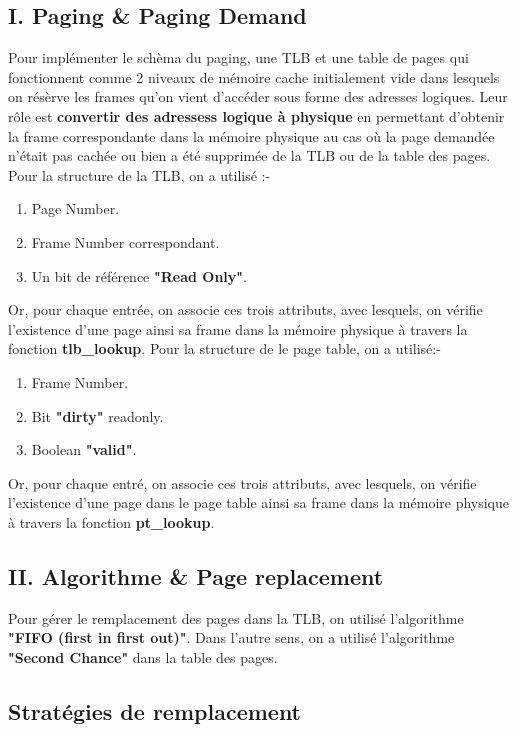 \documentclass{article}
\begin{document}
\subsection*{I. Paging \& Paging Demand}
Pour implémenter le schèma du paging, une TLB et une table de pages qui fonctionnent comme 2 niveaux de mémoire cache initialement vide dans lesquels on résèrve les frames qu'on vient d'accéder sous forme des adresses logiques. Leur rôle est \textbf{convertir des adressess logique à physique} en permettant d'obtenir la frame correspondante dans la mémoire physique au cas où la page demandée n'était pas cachée ou bien a été supprimée de la TLB ou de la table des pages.
Pour la structure de la TLB, on a utilisé :-
\begin{enumerate}
	\item Page Number.
	\item Frame Number correspondant.
	\item Un bit de référence \textbf{"Read Only"}.
\end{enumerate}
Or, pour chaque entrée, on associe ces trois attributs, avec lesquels, on vérifie l'existence d'une page ainsi sa frame dans la mémoire physique à travers la fonction \textbf{tlb\_lookup}.\newline 
Pour la structure de le page table, on a utilisé:-
\begin{enumerate}
	\item Frame Number.
	\item Bit \textbf{"dirty"} readonly.
	\item Boolean \textbf{"valid"}.
\end{enumerate}
Or, pour chaque entré, on associe ces trois attributs, avec lesquels, on vérifie l'existence d'une page dans le page table ainsi sa frame dans la mémoire physique à travers la fonction \textbf{pt\_lookup}.


\subsection*{II. Algorithme \& Page replacement}

Pour gérer le remplacement des pages dans la TLB, on utilisé l'algorithme \textbf{"FIFO (first in first out)"}.\newline
Dans l'autre sens, on a utilisé l'algorithme \textbf{"Second Chance"} dans la table des pages.

\subsection{Stratégies de remplacement}
\end{document}
